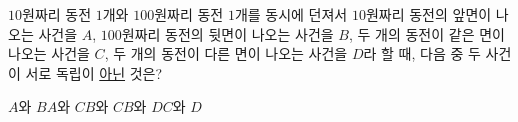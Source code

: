 $10$원짜리 동전 $1$개와 $100$원짜리 동전 $1$개를 동시에 던져서 $10$원짜리 동전의 앞면이 나오는 사건을 $A$, $100$원짜리 동전의 뒷면이 나오는 사건을 $B$, 두 개의 동전이 같은 면이 나오는 사건을 $C$, 두 개의 동전이 다른 면이 나오는 사건을 $D$라 할 때, 다음 중 두 사건이 서로 독립이 \underline{아닌} 것은?
\begin{choices32}{$A$와 $B$}{$A$와 $C$}{$B$와 $C$}{$B$와 $D$}{$C$와 $D$}\end{choices32}
